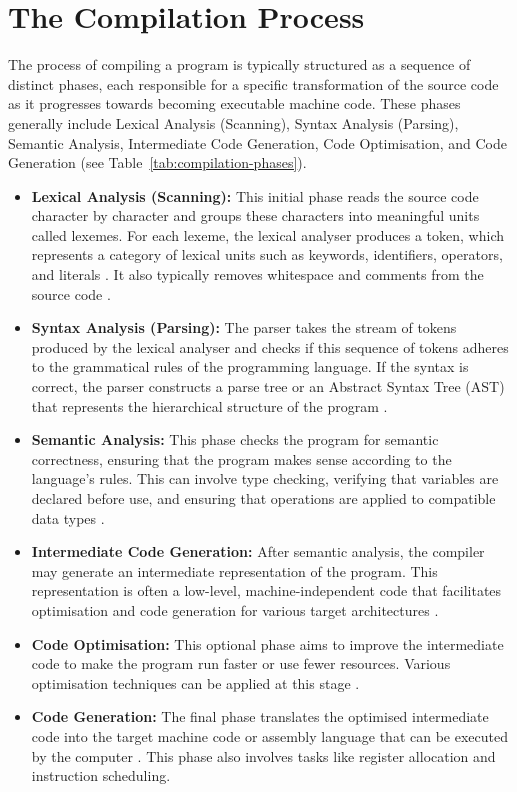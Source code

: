 
\section{The Compilation Process}

The process of compiling a program is typically structured as a sequence of distinct phases, each responsible for a specific transformation of the source code as it progresses towards becoming executable machine code. These phases generally include Lexical Analysis (Scanning), Syntax Analysis (Parsing), Semantic Analysis, Intermediate Code Generation, Code Optimisation, and Code Generation (see Table~\ref{tab:compilation-phases}).


\begin{itemize}
    \item \textbf{Lexical Analysis (Scanning):} This initial phase reads the source code character by character and groups these characters into meaningful units called lexemes. For each lexeme, the lexical analyser produces a token, which represents a category of lexical units such as keywords, identifiers, operators, and literals \cite{aho2007compilers}. It also typically removes whitespace and comments from the source code \cite{aho2007compilers}.
    \item \textbf{Syntax Analysis (Parsing):} The parser takes the stream of tokens produced by the lexical analyser and checks if this sequence of tokens adheres to the grammatical rules of the programming language. If the syntax is correct, the parser constructs a parse tree or an Abstract Syntax Tree (AST) that represents the hierarchical structure of the program \cite{aho2007compilers}.
    \item \textbf{Semantic Analysis:} This phase checks the program for semantic correctness, ensuring that the program makes sense according to the language's rules. This can involve type checking, verifying that variables are declared before use, and ensuring that operations are applied to compatible data types \cite{aho2007compilers}.
    \item \textbf{Intermediate Code Generation:} After semantic analysis, the compiler may generate an intermediate representation of the program. This representation is often a low-level, machine-independent code that facilitates optimisation and code generation for various target architectures \cite{aho2007compilers}.
    \item \textbf{Code Optimisation:} This optional phase aims to improve the intermediate code to make the program run faster or use fewer resources. Various optimisation techniques can be applied at this stage \cite{aho2007compilers}.
    \item \textbf{Code Generation:} The final phase translates the optimised intermediate code into the target machine code or assembly language that can be executed by the computer \cite{aho2007compilers}. This phase also involves tasks like register allocation and instruction scheduling.
\end{itemize}


